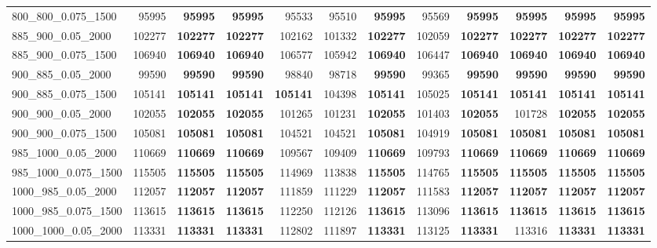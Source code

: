 \begin{landscape}
\begin{longtable}{lrrrrrrrrrrr}
800\_800\_0.075\_1500 & 95995 & \textbf{95995} & \textbf{95995} & 95533 & 95510 & \textbf{95995} & 95569 & \textbf{95995} & \textbf{95995} & \textbf{95995} & \textbf{95995}\\
885\_900\_0.05\_2000 & 102277 & \textbf{102277} & \textbf{102277} & 102162 & 101332 & \textbf{102277} & 102059 & \textbf{102277} & \textbf{102277} & \textbf{102277} & \textbf{102277}\\
885\_900\_0.075\_1500 & 106940 & \textbf{106940} & \textbf{106940} & 106577 & 105942 & \textbf{106940} & 106447 & \textbf{106940} & \textbf{106940} & \textbf{106940} & \textbf{106940}\\
900\_885\_0.05\_2000 & 99590 & \textbf{99590} & \textbf{99590} & 98840 & 98718 & \textbf{99590} & 99365 & \textbf{99590} & \textbf{99590} & \textbf{99590} & \textbf{99590}\\
900\_885\_0.075\_1500 & 105141 & \textbf{105141} & \textbf{105141} & \textbf{105141} & 104398 & \textbf{105141} & 105025 & \textbf{105141} & \textbf{105141} & \textbf{105141} & \textbf{105141}\\
900\_900\_0.05\_2000 & 102055 & \textbf{102055} & \textbf{102055} & 101265 & 101231 & \textbf{102055} & 101403 & \textbf{102055} & 101728 & \textbf{102055} & \textbf{102055}\\
900\_900\_0.075\_1500 & 105081 & \textbf{105081} & \textbf{105081} & 104521 & 104521 & \textbf{105081} & 104919 & \textbf{105081} & \textbf{105081} & \textbf{105081} & \textbf{105081}\\
985\_1000\_0.05\_2000 & 110669 & \textbf{110669} & \textbf{110669} & 109567 & 109409 & \textbf{110669} & 109793 & \textbf{110669} & \textbf{110669} & \textbf{110669} & \textbf{110669}\\
985\_1000\_0.075\_1500 & 115505 & \textbf{115505} & \textbf{115505} & 114969 & 113838 & \textbf{115505} & 114765 & \textbf{115505} & \textbf{115505} & \textbf{115505} & \textbf{115505}\\
1000\_985\_0.05\_2000 & 112057 & \textbf{112057} & \textbf{112057} & 111859 & 111229 & \textbf{112057} & 111583 & \textbf{112057} & \textbf{112057} & \textbf{112057} & \textbf{112057}\\
1000\_985\_0.075\_1500 & 113615 & \textbf{113615} & \textbf{113615} & 112250 & 112126 & \textbf{113615} & 113096 & \textbf{113615} & \textbf{113615} & \textbf{113615} & \textbf{113615}\\
1000\_1000\_0.05\_2000 & 113331 & \textbf{113331} & \textbf{113331} & 112802 & 111897 & \textbf{113331} & 113125 & \textbf{113331} & 113316 & \textbf{113331} & \textbf{113331}\\

\end{longtable}
\end{landscape}
